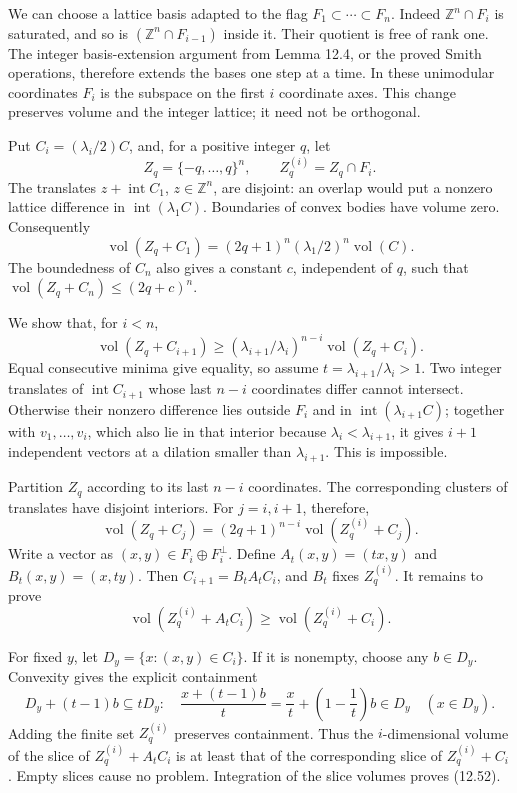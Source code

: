 \documentclass[
  11pt,
  a4paper,
]{article}
\newcounter{none} %
\begin{document}
We can choose a lattice basis adapted to the flag
\(F_1\subset\cdots\subset F_n\). Indeed \(\mathbb Z^n\cap F_i\) is
saturated, and so is \((\mathbb Z^n\cap F_{i-1})\) inside it. Their
quotient is free of rank one. The integer basis-extension argument from
Lemma 12.4, or the proved Smith operations, therefore extends the bases
one step at a time. In these unimodular coordinates \(F_i\) is the
subspace on the first \(i\) coordinate axes. This change preserves
volume and the integer lattice; it need not be orthogonal.

Put \(C_i=(\lambda_i/2)C\), and, for a positive integer \(q\), let \[
Z_q=\{-q,\ldots,q\}^n,\qquad Z_q^{(i)}=Z_q\cap F_i.
\tag{12.48}
\] The translates \(z+\operatorname{int}C_1\), \(z\in\mathbb Z^n\), are
disjoint: an overlap would put a nonzero lattice difference in
\(\operatorname{int}(\lambda_1 C)\). Boundaries of convex bodies have
volume zero. Consequently \[
\operatorname{vol}(Z_q+C_1)
=(2q+1)^n(\lambda_1/2)^n\operatorname{vol}(C).
\tag{12.49}
\] The boundedness of \(C_n\) also gives a constant \(c\), independent
of \(q\), such that \(\operatorname{vol}(Z_q+C_n)\le(2q+c)^n\).

We show that, for \(i<n\), \[
\operatorname{vol}(Z_q+C_{i+1})
\ge(\lambda_{i+1}/\lambda_i)^{n-i}
       \operatorname{vol}(Z_q+C_i).
\tag{12.50}
\] Equal consecutive minima give equality, so assume
\(t=\lambda_{i+1}/\lambda_i>1\). Two integer translates of
\(\operatorname{int}C_{i+1}\) whose last \(n-i\) coordinates differ
cannot intersect. Otherwise their nonzero difference lies outside
\(F_i\) and in \(\operatorname{int}(\lambda_{i+1}C)\); together with
\(v_1,\ldots,v_i\), which also lie in that interior because
\(\lambda_i<\lambda_{i+1}\), it gives \(i+1\) independent vectors at a
dilation smaller than \(\lambda_{i+1}\). This is impossible.

Partition \(Z_q\) according to its last \(n-i\) coordinates. The
corresponding clusters of translates have disjoint interiors. For
\(j=i,i+1\), therefore, \[
\operatorname{vol}(Z_q+C_j)
=(2q+1)^{n-i}\operatorname{vol}(Z_q^{(i)}+C_j).
\tag{12.51}
\] Write a vector as \((x,y)\in F_i\oplus F_i^\perp\). Define
\(A_t(x,y)=(tx,y)\) and \(B_t(x,y)=(x,ty)\). Then \(C_{i+1}=B_tA_tC_i\),
and \(B_t\) fixes \(Z_q^{(i)}\). It remains to prove \[
\operatorname{vol}(Z_q^{(i)}+A_tC_i)
\ge\operatorname{vol}(Z_q^{(i)}+C_i).
\tag{12.52}
\]

For fixed \(y\), let \(D_y=\{x:(x,y)\in C_i\}\). If it is nonempty,
choose any \(b\in D_y\). Convexity gives the explicit containment \[
D_y+(t-1)b\subseteq tD_y:
\quad
\frac{x+(t-1)b}{t}=\frac{x}{t}+
                    \left(1-\frac1t\right)b\in D_y
\quad(x\in D_y).
\tag{12.53}
\] Adding the finite set \(Z_q^{(i)}\) preserves containment. Thus the
\(i\)-dimensional volume of the slice of \(Z_q^{(i)}+A_tC_i\) is at
least that of the corresponding slice of \(Z_q^{(i)}+C_i\). Empty slices
cause no problem. Integration of the slice volumes proves (12.52).
\end{document}
